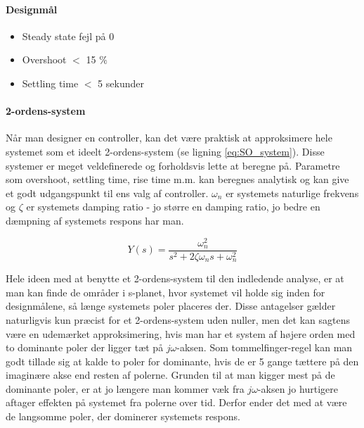 \paragraph{Designmål}

\begin{itemize}

\item Steady state fejl på 0
\item Overshoot $<$ 15 $\%$
\item Settling time $<$ 5 sekunder

\end{itemize}

\paragraph{2-ordens-system}

Når man designer en controller, kan det være praktisk at approksimere hele systemet som et ideelt 2-ordens-system (se ligning \ref{eq:SO_system}). Disse systemer er meget veldefinerede og forholdsvis lette at beregne på. Parametre som overshoot, settling time, rise time m.m. kan beregnes analytisk og kan give et godt udgangspunkt til ens valg af controller. $\omega_{n}$ er systemets naturlige frekvens og $\zeta$ er systemets damping ratio - jo større en damping ratio, jo bedre en dæmpning af systemets respons har man.

\begin{equation}\label{eq:SO_system}
Y(s)=\frac{\omega_{n}^2}{s^2+2\zeta\omega_{n}s+\omega_{n}^2}
\end{equation}

Hele ideen med at benytte et 2-ordens-system til den indledende analyse, er at man kan finde de områder i s-planet, hvor systemet vil holde sig inden for designmålene, så længe systemets poler placeres der. Disse antagelser gælder naturligvis kun præcist for et 2-ordens-system uden nuller, men det kan sagtens være en udemærket approksimering, hvis man har et system af højere orden med to dominante poler der ligger tæt på $j\omega$-aksen. Som tommelfinger-regel kan man godt tillade sig at kalde to poler for dominante, hvis de er 5 gange tættere på den imaginære akse end resten af polerne. Grunden til at man kigger mest på de dominante poler, er at jo længere man kommer væk fra $j\omega$-aksen jo hurtigere aftager effekten på systemet fra polerne over tid. Derfor ender det med at være de langsomme poler, der dominerer systemets respons.

